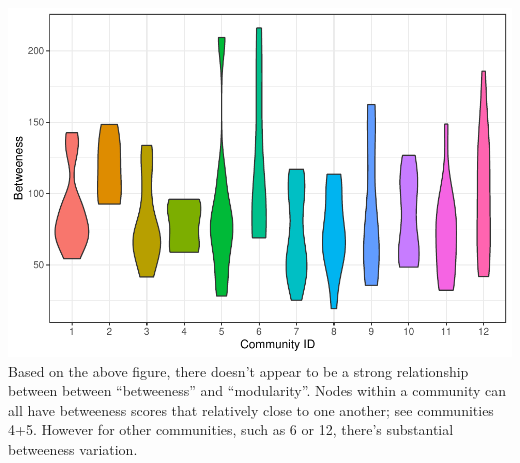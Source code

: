 \documentclass[
]{article}
\begin{document}
\includegraphics{communities_writeup_files/figure-latex/unnamed-chunk-10-1.pdf}
Based on the above figure, there doesn't appear to be a strong
relationship between between ``betweeness'' and ``modularity''. Nodes
within a community can all have betweeness scores that relatively close
to one another; see communities 4+5. However for other communities, such
as 6 or 12, there's substantial betweeness variation.
\end{document}
